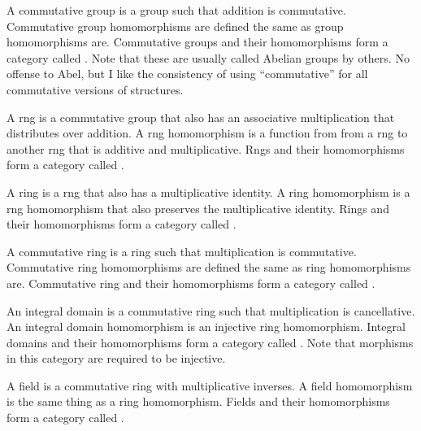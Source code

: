 \documentclass[../math.tex]{subfiles}
\begin{document}
\begin{definition}
    A commutative group is a group such that addition is commutative.
    Commutative group homomorphisms are defined the same as group homomorphisms
    are.  Commutative groups and their homomorphisms form a category called
    .  Note that these are usually called Abelian groups by others.
    No offense to Abel, but I like the consistency of using ``commutative'' for
    all commutative versions of structures.
\end{definition}

\begin{definition}
    A rng is a commutative group that also has an associative multiplication
    that distributes over addition.  A rng homomorphism is a function from from
    a rng to another rng that is additive and multiplicative.  Rngs and their
    homomorphisms form a category called .
\end{definition}

\begin{definition}
    A ring is a rng that also has a multiplicative identity.  A ring
    homomorphism is a rng homomorphism that also preserves the multiplicative
    identity.  Rings and their homomorphisms form a category called .
\end{definition}

\begin{definition}
    A commutative ring is a ring such that multiplication is commutative.
    Commutative ring homomorphisms are defined the same as ring homomorphisms
    are.  Commutative ring and their homomorphisms form a category called
    .
\end{definition}

\begin{definition}
    An integral domain is a commutative ring such that multiplication is
    cancellative.  An integral domain homomorphism is an injective ring
    homomorphism.  Integral domains and their homomorphisms form a category
    called .  Note that morphisms in this category are required to
    be injective.
\end{definition}

\begin{definition}
    A field is a commutative ring with multiplicative inverses.  A field
    homomorphism is the same thing as a ring homomorphism.  Fields and their
    homomorphisms form a category called .
\end{definition}
\end{document}
